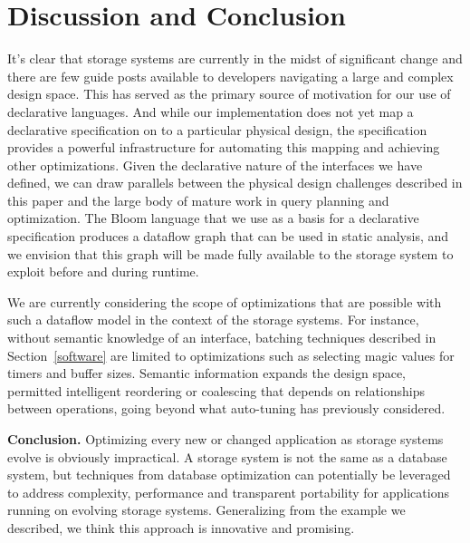 \section{Discussion and Conclusion}
\label{sec:opts}

It's clear that storage systems are currently in the midst of significant
change and there are few guide posts available to developers navigating a
large and complex design space. This has served as the primary source
of motivation for our use of declarative languages. And while our
implementation does not yet map a declarative specification on to a particular
physical design, the specification provides a powerful infrastructure for
automating this mapping and achieving other optimizations.
Given the declarative nature of the interfaces we have defined, we can draw
parallels between the physical design challenges described in this paper and
the large body of mature work in query planning and optimization.  The Bloom
language that we use as a basis for a declarative specification
produces a dataflow graph that can be used in static analysis, and we
envision that this graph will be made fully available to the storage system to
exploit before and during runtime.

We are currently considering the scope of optimizations that are possible with
such a dataflow model in the context of the storage systems. For instance, without
semantic knowledge of an interface, batching techniques described in
Section~\ref{software} are limited to optimizations such as selecting magic
values for timers and buffer sizes. Semantic information expands the design
space, permitted intelligent reordering or coalescing that depends on
relationships between operations, going beyond what auto-tuning has
previously considered.

{\bf Conclusion.} Optimizing every new or changed application as storage
systems evolve is obviously impractical.  A storage system is not the same as a
database system, but techniques from database optimization can potentially be
leveraged to address complexity, performance and transparent portability for
applications running on evolving storage systems.  Generalizing from the
example we described, we think this approach is innovative and promising. 

